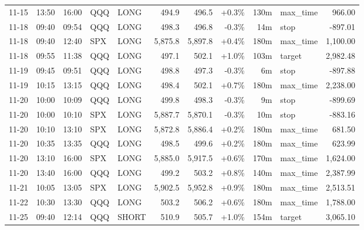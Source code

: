 \documentclass[11pt,a4paper,twoside]{article}
\begin{document}
\begin{center}
\begin{longtable}{>{\color{txtmain}}l l l l l r r r r >{\color{txtmain}}l r}
11-15 & 13:50 & 16:00 & QQQ & LONG & 494.9 & 496.5 & \textcolor{wingreen}{+0.3\%} & 130m & max\_time & \textcolor{wingreen}{966.00} \\
11-18 & 09:40 & 09:54 & QQQ & LONG & 498.3 & 496.8 & \textcolor{lossred}{-0.3\%} & 14m & stop & \textcolor{lossred}{-897.01} \\
11-18 & 09:40 & 12:40 & SPX & LONG & 5,875.8 & 5,897.8 & \textcolor{wingreen}{+0.4\%} & 180m & max\_time & \textcolor{wingreen}{1,100.00} \\
11-18 & 09:55 & 11:38 & QQQ & LONG & 497.1 & 502.1 & \textcolor{wingreen}{+1.0\%} & 103m & target & \textcolor{wingreen}{2,982.48} \\
11-19 & 09:45 & 09:51 & QQQ & LONG & 498.8 & 497.3 & \textcolor{lossred}{-0.3\%} & 6m & stop & \textcolor{lossred}{-897.88} \\
11-19 & 10:15 & 13:15 & QQQ & LONG & 498.4 & 502.1 & \textcolor{wingreen}{+0.7\%} & 180m & max\_time & \textcolor{wingreen}{2,238.00} \\
11-20 & 10:00 & 10:09 & QQQ & LONG & 499.8 & 498.3 & \textcolor{lossred}{-0.3\%} & 9m & stop & \textcolor{lossred}{-899.69} \\
11-20 & 10:00 & 10:10 & SPX & LONG & 5,887.7 & 5,870.1 & \textcolor{lossred}{-0.3\%} & 10m & stop & \textcolor{lossred}{-883.16} \\
11-20 & 10:10 & 13:10 & SPX & LONG & 5,872.8 & 5,886.4 & \textcolor{wingreen}{+0.2\%} & 180m & max\_time & \textcolor{wingreen}{681.50} \\
11-20 & 10:35 & 13:35 & QQQ & LONG & 498.5 & 499.6 & \textcolor{wingreen}{+0.2\%} & 180m & max\_time & \textcolor{wingreen}{623.99} \\
11-20 & 13:10 & 16:00 & SPX & LONG & 5,885.0 & 5,917.5 & \textcolor{wingreen}{+0.6\%} & 170m & max\_time & \textcolor{wingreen}{1,624.00} \\
11-20 & 13:40 & 16:00 & QQQ & LONG & 499.2 & 503.2 & \textcolor{wingreen}{+0.8\%} & 140m & max\_time & \textcolor{wingreen}{2,387.99} \\
11-21 & 10:05 & 13:05 & SPX & LONG & 5,902.5 & 5,952.8 & \textcolor{wingreen}{+0.9\%} & 180m & max\_time & \textcolor{wingreen}{2,513.51} \\
11-22 & 10:30 & 13:30 & QQQ & LONG & 503.2 & 506.2 & \textcolor{wingreen}{+0.6\%} & 180m & max\_time & \textcolor{wingreen}{1,788.00} \\
11-25 & 09:40 & 12:14 & QQQ & SHORT & 510.9 & 505.7 & \textcolor{wingreen}{+1.0\%} & 154m & target & \textcolor{wingreen}{3,065.10} \\

\end{longtable}
\end{center}
\end{document}
